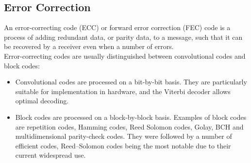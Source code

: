 \subsection{Error Correction}
An error-correcting code (ECC) or forward error correction (FEC) code is a process of adding redundant data, or parity data, to a message, such that it can be recovered by a receiver even when a number of errors.\\
Error-correcting codes are usually distinguished between convolutional codes and block codes:
\begin{itemize}
    \item Convolutional codes are processed on a bit-by-bit basis. They are particularly suitable for implementation in hardware, and the Viterbi decoder allows optimal decoding.
    \item Block codes are processed on a block-by-block basis. Examples of block codes are repetition codes, Hamming codes, Reed Solomon codes, Golay, BCH and multidimensional parity-check codes. They were followed by a number of efficient codes, Reed–Solomon codes being the most notable due to their current widespread use.
\end{itemize}
%
%
